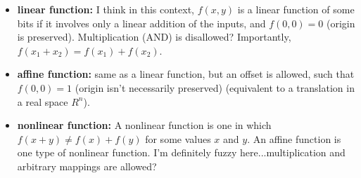 \begin{itemize}
\item {\bf linear function:} I think in this context, $f(x,y)$ is a linear
  function of some bits if it involves only a linear addition of
  the inputs, and $f(0,0) = 0$ (origin is preserved).  Multiplication
  (AND) is disallowed?  Importantly, $f(x_1 + x_2) = f(x_1) + f(x_2)$.
\item {\bf affine function:} same as a linear function, but an offset is
  allowed, such that $f(0,0) = 1$ (origin isn't necessarily preserved)
  (equivalent to a translation in a real space $R^n$).
\item {\bf nonlinear function:} A nonlinear function is one in which $f(x+y) \ne f(x) + f(y)$ for some values $x$ and $y$. An affine function is one type of nonlinear function. I'm definitely fuzzy here...multiplication and
  arbitrary mappings are allowed?
\end{itemize}

